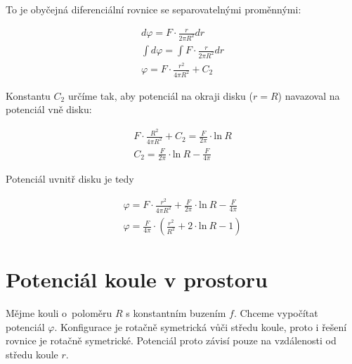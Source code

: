 \documentclass{book}
\begin{document}
To je obyčejná diferenciální rovnice se separovatelnými proměnnými:

\begin{equation}
\label{eq:potencial_disku_uvnitr}
\begin{split}
d \varphi = F \cdot \frac{r}{2 \pi R^2} dr \\
\int d \varphi = \int F \cdot \frac{r}{2 \pi R^2} dr \\
\varphi = F \cdot \frac{r^2}{4 \pi R^2} + C_2
\end{split}
\end{equation}

Konstantu \(C_2\) určíme tak, aby potenciál na okraji disku (\(r = R\)) navazoval na potenciál vně disku:

\begin{equation}
\begin{split}
F \cdot \frac{R^2}{4 \pi R^2} + C_2 = \frac{F}{2 \pi} \cdot \mathrm{ln} \ R \\
C_2 = \frac{F}{2 \pi} \cdot \mathrm{ln} \ R - \frac{F}{4 \pi}
\end{split}
\end{equation}

Potenciál uvnitř disku je tedy

\begin{equation}
\begin{split}
\varphi = F \cdot \frac{r^2}{4 \pi R^2} + \frac{F}{2 \pi} \cdot \mathrm{ln} \ R - \frac{F}{4 \pi} \\
\varphi = \frac{F}{4 \pi} \cdot \left (\frac{r^2}{R^2} + 2 \cdot \mathrm{ln} \ R - 1 \right)
\end{split}
\end{equation}


\section{Potenciál koule v prostoru}

Mějme kouli o~poloměru \(R\) s konstantním buzením \(f\). Chceme vypočítat potenciál \(\varphi\). Konfigurace je rotačně symetrická vůči středu
koule, proto i řešení rovnice je rotačně symetrické. Potenciál proto závisí pouze na vzdálenosti od středu koule \(r\).


\end{document}
